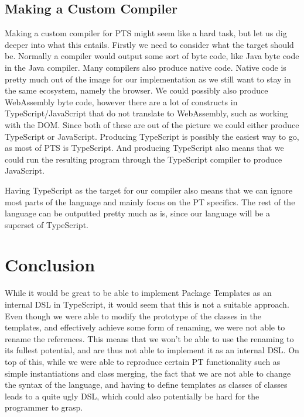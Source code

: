 \subsection{Making a Custom Compiler}\label{subsec:making-a-custom-compiler}

Making a custom compiler for PTS might seem like a hard task, but let us dig deeper into what this entails.
Firstly we need to consider what the target should be.
Normally a compiler would output some sort of byte code, like Java byte code in the Java compiler.
Many compilers also produce native code.
Native code is pretty much out of the image for our implementation as we still want to stay in the same ecosystem, namely the browser.
We could possibly also produce WebAssembly byte code, however there are a lot of constructs in TypeScript/JavaScript that do not translate to WebAssembly, such as working with the DOM\@.
Since both of these are out of the picture we could either produce TypeScript or JavaScript.
Producing TypeScript is possibly the easiest way to go, as most of PTS is TypeScript.
And producing TypeScript also means that we could run the resulting program through the TypeScript compiler to produce JavaScript.

Having TypeScript as the target for our compiler also means that we can ignore most parts of the language and mainly focus on the PT specifics.
The rest of the language can be outputted pretty much as is, since our language will be a superset of TypeScript.


\section{Conclusion}\label{sec:planning-conclusion}


While it would be great to be able to implement Package Templates as an internal DSL in TypeScript, it would seem that this is not a suitable approach.
Even though we were able to modify the prototype of the classes in the templates, and effectively achieve some form of renaming, we were not able to rename the references.
This means that we won't be able to use the renaming to its fullest potential, and are thus not able to implement it as an internal DSL\@.
On top of this, while we were able to reproduce certain PT functionality such as simple instantiations and class merging, the fact that we are not able to change the syntax of the language, and having to define templates as classes of classes leads to a quite ugly DSL, which could also potentially be hard for the programmer to grasp.

